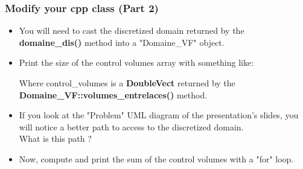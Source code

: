 \documentclass[10pt, hyperref={unicode=true,pdfusetitle, bookmarks=true,bookmarksnumbered=false,bookmarksopen=false, breaklinks=false,pdfborder={0 0 1},backref=true,colorlinks=true,linkcolor=darkblue,pageanchor, urlcolor=darkblue}]{beamer}
\begin{document}
\begin{frame}
\frametitle{Modify your cpp class (Part 2)}
\begin{block}{}

\begin{itemize}
\item You will need to cast the discretized domain returned by the \textbf{domaine\_dis()} method into a "Domaine\_VF" object.

\item Print the size of the control volumes array with something like:
\begin{center}
\end{center}

Where control\_volumes is a \textbf{DoubleVect} returned by the \textbf{Domaine\_VF::volumes\_entrelaces()} method.
\item If you look at the "Problem" UML diagram of the presentation's slides, you will notice a better path to access to the discretized domain. \\
 What is this path ?
\item Now, compute and print the sum of the control volumes with a "for" loop.

\end{itemize}

\end{block}
\end{frame}
\end{document}
